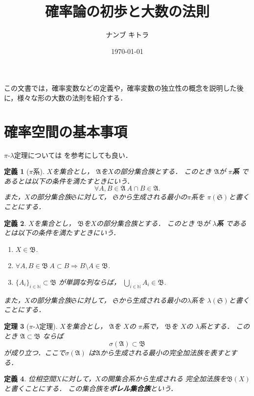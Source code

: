 \documentclass[leqno, a4paper, 12pt]{jsarticle}
\title{確率論の初歩と大数の法則}
\author{ナンブ キトラ}
\date{\today}
\newtheorem{thm}{定理}
\newtheorem{df}[thm]{定義}
\newcommand{\To}{\Longrightarrow}
\newcommand{\nn}{\mathbb{N}}
\begin{document}
\maketitle

この文書では，確率変数などの定義や，確率変数の独立性の概念を説明した後に，様々な形の大数の法則を紹介する．


\section{確率空間の基本事項}
$\pi$-$\lambda$定理については
\cite{hatena0}
を参考にしても良い．
\begin{df}[$\pi$系]
$X$を集合とし，
$\mathfrak{A}$を$X$の部分集合族とする．
このとき
$\mathfrak{A}$が
\textbf{$\pi$系}
であるとは以下の条件を満たすときにいう．
\[
\forall A, B\in \mathfrak{A}\ A\cap B\in \mathfrak{A}. 
\]
また，$X$の部分集合族$\mathfrak{S}$に対して，
$\mathfrak{S}$から生成される最小の$\pi$系を
$\pi(\mathfrak{S})$と書くことにする．
\end{df}

\begin{df}
$X$を集合とし，
$\mathfrak{B}$を$X$の部分集合族とする．
このとき
$\mathfrak{B}$が
\textbf{$\lambda$系}
であるとは以下の条件を満たすときにいう．
\begin{enumerate}
\item[\emph{($\lambda$1)}] $X\in \mathfrak{B}$. 
\item[\emph{($\lambda$2)}] $\forall A, B\in \mathfrak{B}\ 
A\subset B\To B\setminus A\in \mathfrak{B}$. 
\item[\emph{($\lambda$3)}] 
$\{A_{i}\}_{i\in \nn}\subset \mathfrak{B}$
が単調な列ならば，
$\bigcup_{i\in \nn}A_{i}\in \mathfrak{B}$. 
\end{enumerate}
また，$X$の部分集合族$\mathfrak{S}$に対して，
$\mathfrak{S}$から生成される最小の$\lambda$系を
$\lambda(\mathfrak{S})$と書くことにする．

\end{df}

\begin{thm}[$\pi$-$\lambda$定理]\label{thm:plthm}
$X$を集合とし，
$\mathfrak{A}$を
$X$の
$\pi$系で，
$\mathfrak{B}$を
$X$の
$\lambda$系とする．
このとき
$\mathfrak{A}\subset \mathfrak{B}$
ならば
\[
\sigma(\mathfrak{A})\subset \mathfrak{B}
\]
が成り立つ．ここで$\sigma(\mathfrak{A})$
は$\mathfrak{A}$から生成される最小の完全加法族を表すとする．
\end{thm}

\begin{df}
位相空間$X$に対して，$X$の開集合系から生成される
完全加法族を$\mathfrak{B}(X)$と書くことにする．
この集合族を\textbf{ボレル集合族}という．
\end{df}
\end{document}
